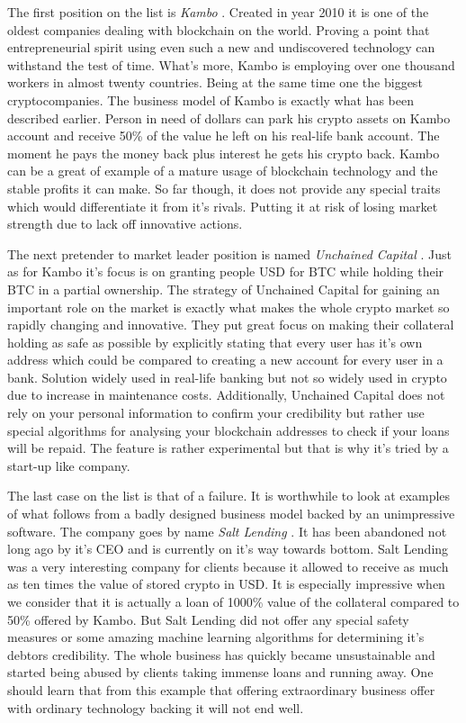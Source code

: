 \documentclass[a4paper,12pt,twoside,openany]{report}
\begin{document}
The first position on the list is \textit{Kambo} \cite{kambo}. Created in year 2010 it is one of the oldest companies dealing with blockchain on the world. Proving a point that entrepreneurial spirit using even such a new and undiscovered technology can withstand the test of time. What's more, Kambo is employing over one thousand workers in almost twenty countries. Being at the same time one the biggest cryptocompanies. The business model of Kambo is exactly what has been described earlier. Person in need of dollars can park his crypto assets on Kambo account and receive 50\% of the value he left on his real-life bank account. The moment he pays the money back plus interest he gets his crypto back. Kambo can be a great of example of a mature usage of blockchain technology and the stable profits it can make. So far though, it does not provide any special traits which would differentiate it from it's rivals. Putting it at risk of losing market strength due to lack off innovative actions.

The next pretender to market leader position is named \textit{Unchained Capital} \cite{unchained}. Just as for Kambo it's focus is on granting people USD for BTC while holding their BTC in a partial ownership. The strategy of Unchained Capital for gaining an important role on the market is exactly what makes the whole crypto market so rapidly changing and innovative. They put great focus on making their collateral holding as safe as possible by explicitly stating that every user has it's own address which could be compared to creating a new account for every user in a bank. Solution widely used in real-life banking but not so widely used in crypto due to increase in maintenance costs. Additionally, Unchained Capital does not rely on your personal information to confirm your credibility but rather use special algorithms for analysing your blockchain addresses to check if your loans will be repaid. The feature is rather experimental but that is why it's tried by a start-up like company.

The last case on the list is that of a failure. It is worthwhile to look at examples of what follows from a badly designed business model backed by an unimpressive software. The company goes by name \textit{Salt Lending} \cite{saltlending}. It has been abandoned not long ago by it's CEO and is currently on it's way towards bottom. Salt Lending was a very interesting company for clients because it allowed to receive as much as ten times the value of stored crypto in USD. It is especially impressive when we consider that it is actually a loan of 1000\% value of the collateral compared to 50\% offered by Kambo. But Salt Lending did not offer any special safety measures or some amazing machine learning algorithms for determining it's debtors credibility. The whole business has quickly became unsustainable and started being abused by clients taking immense loans and running away. One should learn that from this example that offering extraordinary business offer with ordinary technology backing it will not end well.
\end{document}
